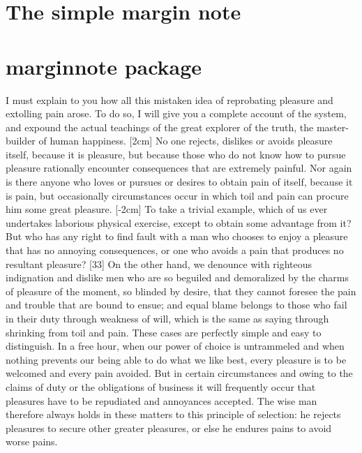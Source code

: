 \documentclass[12pt]{report}
\begin{document}
\section{The simple margin note }
\lipsum[2]
\renewcommand{\marginparwidth}{5em} %
\renewcommand{\marginparsep}{1em} %
\renewcommand{\marginparpush}{2em} %

\lipsum[2]

\section{marginnote package}
I must explain to you how all this mistaken idea of reprobating pleasure and extolling pain arose. To do so, I will give you a complete account of the system, and expound the actual teachings of the great explorer of the truth, the master-builder of human happiness. [2cm] No one rejects, dislikes or avoids pleasure itself, because it is pleasure, but because those who do not know how to pursue pleasure rationally encounter consequences that are extremely painful. Nor again is there anyone who loves or pursues or desires to obtain pain of itself, because it is pain, but occasionally circumstances occur in which toil and pain can procure him some great pleasure. \reversemarginpar{}[-2cm] To take a trivial example, which of us ever undertakes laborious physical exercise, except to obtain some advantage from it? But who has any right to find fault with a man who chooses to enjoy a pleasure that has no annoying consequences, or one who avoids a pain that produces no resultant pleasure? [33] On the other hand, we denounce with righteous indignation and dislike men who are so beguiled and demoralized by the charms of pleasure of the moment, so blinded by desire, that they cannot foresee the pain and trouble that are bound to ensue; and equal blame belongs to those who fail in their duty through weakness of will, which is the same as saying through shrinking from toil and pain. These cases are perfectly simple and easy to distinguish. In a free hour, when our power of choice is untrammeled and when nothing prevents our being able to do what we like best, every pleasure is to be welcomed and every pain avoided. But in certain circumstances and owing to the claims of duty or the obligations of business it will frequently occur that pleasures have to be repudiated and annoyances accepted. The wise man therefore always holds in these matters to this principle of selection: he rejects pleasures to secure other greater pleasures, or else he endures pains to avoid worse pains.
\end{document}
